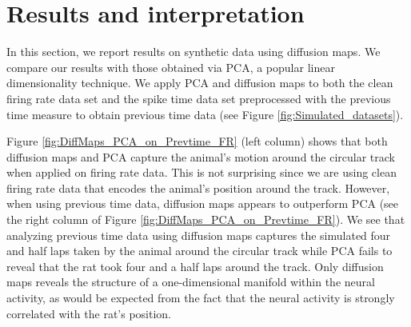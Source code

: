 
\section{Results and interpretation}
In this section, we report results on  synthetic data using diffusion maps. We compare our results with those obtained via PCA, a popular linear dimensionality technique. We apply PCA and diffusion maps to both the 
clean firing rate data set and the spike time data set preprocessed  with the previous time measure to obtain previous time data (see Figure \ref{fig:Simulated_datasets}).


Figure \ref{fig:DiffMaps_PCA_on_Prevtime_FR} (left column) shows that both diffusion maps  and PCA capture the animal's motion around the circular track when applied on firing rate data. This is not surprising since we are using clean firing rate data that encodes the animal's position around the track. However, when using previous time data, diffusion maps  appears to outperform PCA (see the right column of Figure  \ref{fig:DiffMaps_PCA_on_Prevtime_FR}). We  see that analyzing previous time data using diffusion maps captures the simulated four and half laps taken by the animal around the circular track while PCA  fails to reveal that the rat took four and a half laps  around the track. 
Only diffusion maps reveals the structure of a one-dimensional manifold within the neural activity, as would be expected from the fact that the neural activity is strongly correlated with the rat's position.





